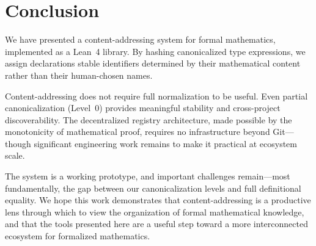\section{Conclusion}
\label{sec:conclusion}

We have presented a content-addressing system for formal mathematics,
implemented as a Lean~4 library.  By hashing canonicalized type
expressions, we assign declarations stable identifiers determined by
their mathematical content rather than their human-chosen names.

Content-addressing does not require full normalization to be useful.
Even partial canonicalization (Level~0) provides meaningful stability
and cross-project discoverability.  The decentralized registry
architecture, made possible by the monotonicity of mathematical proof,
requires no infrastructure beyond Git---though significant engineering
work remains to make it practical at ecosystem scale.

The system is a working prototype, and important challenges
remain---most fundamentally, the gap between our canonicalization levels
and full definitional equality.  We hope this work demonstrates that
content-addressing is a productive lens through which to view the
organization of formal mathematical knowledge, and that the tools
presented here are a useful step toward a more interconnected ecosystem
for formalized mathematics.




